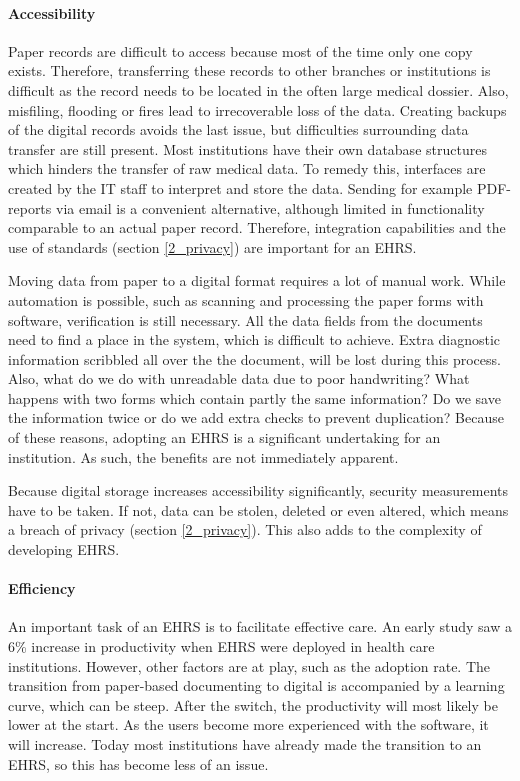     \paragraph{Accessibility} Paper records are difficult to access because most of the time only one copy exists. Therefore, transferring these records to other branches or institutions is difficult as the record needs to be located in the often large medical dossier. Also, misfiling, flooding or fires lead to irrecoverable loss of the data. Creating backups of the digital records avoids the last issue, but difficulties surrounding data transfer are still present. Most institutions have their own database structures which hinders the transfer of raw medical data. To remedy this, interfaces are created by the IT staff to interpret and store the data. Sending for example PDF-reports via email is a convenient alternative, although limited in functionality comparable to an actual paper record. Therefore, integration capabilities and the use of standards (section \ref{2_privacy}) are important for an EHRS\@. %

    Moving data from paper to a digital format requires a lot of manual work. While automation is possible, such as scanning and processing the paper forms with software, verification is still necessary. All the data fields from the documents need to find a place in the system, which is difficult to achieve. Extra diagnostic information scribbled all over the the document, will be lost during this process. Also, what do we do with unreadable data due to poor handwriting? What happens with two forms which contain partly the same information? Do we save the information twice or do we add extra checks to prevent duplication? Because of these reasons, adopting an EHRS is a significant undertaking for an institution. As such, the benefits are not immediately apparent.

    Because digital storage increases accessibility significantly, security measurements have to be taken. If not, data can be stolen, deleted or even altered, which means a breach of privacy (section \ref{2_privacy}). This also adds to the complexity of developing EHRS\@. %

    \paragraph{Efficiency} An important task of an EHRS is to facilitate effective care. An early study saw a 6\% increase in productivity when EHRS were deployed in health care institutions\cite{ehrs_efficiency}. However, other factors are at play, such as the adoption rate. The transition from paper-based documenting to digital is accompanied by a learning curve, which can be steep. After the switch, the productivity will most likely be lower at the start. As the users become more experienced with the software, it will increase. Today most institutions have already made the transition to an EHRS, so this has become less of an issue.

